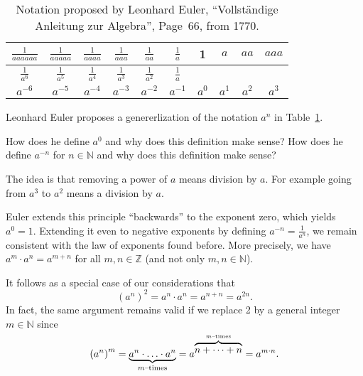 \begin{table}[ht]
	\centering
	\renewcommand{\arraystretch}{1.5}
	\begin{tabular}{|c|c|c|c|c|c|c|c|c|c|} \hline
		$\frac{1}{aaaaaa}$ & $\frac{1}{aaaaa}$ & $\frac{1}{aaaa}$ & $\frac{1}{aaa}$ & $\frac{1}{aa}$ & $\frac{1}{a}$ & 1 & $a$ & $aa$ & $aaa$ \\ \hline
		$\frac{1}{a^6}$ & $\frac{1}{a^5}$ & $\frac{1}{a^4}$ & $\frac{1}{a^3}$ & $\frac{1}{a^2}$ & $\frac{1}{a}$ & & & & \\ \hline
		$a^{-6}$ & $a^{-5}$ & $a^{-4}$ & $a^{-3}$ & $a^{-2}$ & $a^{-1}$ & $a^0$ & $a^1$ & $a^2$ & $a^3$ \\ \hline
	\end{tabular}
	\caption{Notation proposed by Leonhard Euler, ``Vollständige Anleitung zur Algebra'', Page~66, from 1770.}
	\label{tab:euler_powers}
\end{table}
\begin{exercise}
	Leonhard Euler proposes a genererlization of the notation $a^n$ in Table~\ref{tab:euler_powers}.
	\begin{tasks}
		\task How does he define $a^0$ and why does this definition make sense?
		\task How does he define $a^{-n}$ for $n\in\mathbb N$ and why does this definition make sense?
	\end{tasks}
\end{exercise}
\begin{solution*}
	The idea is that removing a power of $a$ means division by $a$.
	For example going from $a^3$ to $a^2$ means a division by $a$.
	\begin{tasks}
		\task Euler extends this principle ``backwards'' to the exponent zero, which yields $a^0=1$.
		\task Extending it even to negative exponents by defining $a^{-n}=\frac{1}{a^n}$, we remain consistent with the law of exponents found before.
		More precisely, we have $a^m\cdot a^n=a^{m+n}$ for all $m,n\in\mathbb Z$ (and not only $m,n\in\mathbb N$).
	\end{tasks}
\end{solution*}
It follows as a special case of our considerations that
\begin{equation*}
	\left(a^n\right)^2=a^n\cdot a^n=a^{n+n}=a^{2n}.
\end{equation*}
In fact, the same argument remains valid if we replace 2 by a general integer $m\in\mathbb N$ since
\begin{equation*}
	\left(a^n\right)^m=\underbrace{a^n\cdot\ldots\cdot a^n}_{m\text{--times}}=a^{\overbrace{n+\cdots +n}^{\smash{m\text{--times}}}}=a^{m\cdot n}.
\end{equation*}
